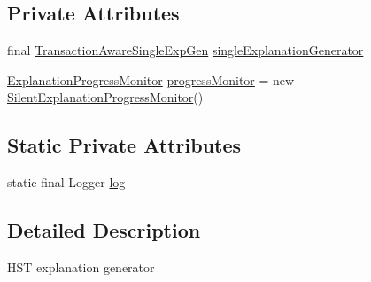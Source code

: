 \subsection*{Private Attributes}
\begin{DoxyCompactItemize}
\item 
final \hyperlink{interfacecom_1_1clarkparsia_1_1owlapi_1_1explanation_1_1_transaction_aware_single_exp_gen}{Transaction\-Aware\-Single\-Exp\-Gen} \hyperlink{classcom_1_1clarkparsia_1_1owlapi_1_1explanation_1_1_h_s_t_explanation_generator_a85e3661c6342eb22238b33589cbc1abb}{single\-Explanation\-Generator}
\item 
\hyperlink{interfacecom_1_1clarkparsia_1_1owlapi_1_1explanation_1_1util_1_1_explanation_progress_monitor}{Explanation\-Progress\-Monitor} \hyperlink{classcom_1_1clarkparsia_1_1owlapi_1_1explanation_1_1_h_s_t_explanation_generator_a7bdbc0d09a1d9d0067b51c99cd479d82}{progress\-Monitor} = new \hyperlink{classcom_1_1clarkparsia_1_1owlapi_1_1explanation_1_1util_1_1_silent_explanation_progress_monitor}{Silent\-Explanation\-Progress\-Monitor}()
\end{DoxyCompactItemize}
\subsection*{Static Private Attributes}
\begin{DoxyCompactItemize}
\item 
static final Logger \hyperlink{classcom_1_1clarkparsia_1_1owlapi_1_1explanation_1_1_h_s_t_explanation_generator_a2fac81a8439dd8c3dc2c97379f8163e1}{log}
\end{DoxyCompactItemize}


\subsection{Detailed Description}
H\-S\-T explanation generator 

